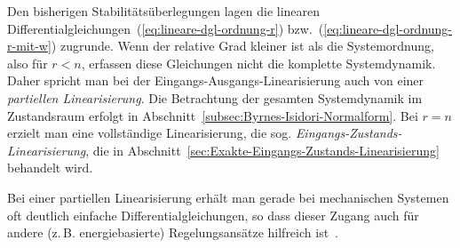 Den bisherigen Stabilitätsüberlegungen lagen die linearen Differentialgleichungen~(\ref{eq:lineare-dgl-ordnung-r})
bzw.~(\ref{eq:lineare-dgl-ordnung-r-mit-w}) zugrunde. Wenn der relative
Grad kleiner ist als die System\-ordnung, also für $r<n$, erfassen
diese Gleichungen nicht die komplette System\-dynamik. Daher spricht
man bei der Eingangs-Ausgangs-Linearisierung auch von einer \emph{partiellen
Linearisierung}.
Die Betrachtung der gesamten System\-dynamik im Zustandsraum erfolgt
in Abschnitt~\ref{subsec:Byrnes-Isidori-Normalform}. Bei $r=n$
erzielt man eine vollständige Linearisierung, die sog. \emph{Eingangs-Zustands-Linearisierung},
die in Abschnitt~\ref{sec:Exakte-Eingangs-Zustands-Linearisierung}
behandelt wird.

Bei einer partiellen Linearisierung erhält man gerade bei mechanischen
Systemen oft deutlich einfache Differentialgleichungen, so dass dieser
Zugang auch für andere (z.\,B. energiebasierte) Regelungsansätze
hilfreich ist~\cite{spong1996}.

